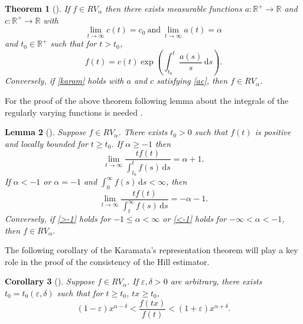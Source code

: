 \documentclass[english,12pt,a4paper,pdftex,sci,utf8]{aaltothesis} %
\newtheorem{theorem}{Theorem}[section]
\newtheorem{corollary}[theorem]{Corollary}
\newtheorem{lemma}[theorem]{Lemma}
\begin{document}
\begin{theorem}[{\cite[Theorem B.1.6]{deHaan}}]
If $f \in RV_{\alpha}$ then there exists measurable functions $a: \mathbb{R^+} \rightarrow \mathbb{R}$ and $c: \mathbb{R^+} \rightarrow \mathbb{R}$ with
\begin{equation}
\lim_{t \rightarrow \infty} c(t) = c_0 \  \text{and} \  \lim_{t \rightarrow \infty} a(t) = \alpha
\label{ac}
\end{equation}
and $t_0 \in \mathbb{R^+}$ such that for $t > t_0$,
\begin{equation}
f(t) = c(t) \exp \left(\int_{t_0}^{t}  \frac{a(s)}{s} \, \mathrm{d}s \right).
\label{karam}
\end{equation}
Conversely, if \eqref{karam} holds with $a$ and $c$ satisfying \eqref{ac}, then $f \in RV_{\alpha}$.
\label{karamata}
\end{theorem}

For the proof of the above theorem following lemma about the integrals of the regularly varying functions is needed \cite{deHaan}.

\begin{lemma}[{\cite[Theorem B.1.5]{deHaan}}]
Suppose $f \in RV_{\alpha}$. There exists $t_0 > 0$ such that $f(t)$ is positive and locally bounded for $t \geq t_0$. If $\alpha \geq -1$ then
\begin{equation}
\lim_{t \rightarrow \infty} \frac{tf(t)}{\int_{t_0}^{t}f(s) \, \mathrm{d}s} = \alpha + 1.
\label{>-1}
\end{equation}
If $\alpha<-1$ or $\alpha= -1$ and $\int_{0}^{\infty}f(s) \, \mathrm{d}s<\infty$, then
\begin{equation}
\lim_{t \rightarrow \infty} \frac{tf(t)}{\int_{t}^{\infty} f(s) \, \mathrm{d}s} = -\alpha - 1.
\label{<-1}
\end{equation}
Conversely, if \eqref{>-1} holds for $-1\leq \alpha < \infty$ or \eqref{<-1} holds for $-\infty<\alpha<-1$, then $f \in RV_{\alpha}$.
\label{karamlemma}
\end{lemma}



The following corollary \cite{potter} of the Karamata’s representation theorem will play a key role in the proof of the consistency of the Hill estimator. 

\begin{corollary}[{\cite[Proposition B.1.9]{deHaan}}]
Suppose $f \in RV_{\alpha}$. If $\varepsilon, \delta>0$ are arbitrary, there exists $t_0=t_0(\varepsilon, \delta)$ such that for $t\geq t_0$, $tx \geq t_0$,
\begin{equation*}
(1-\varepsilon)x^{\alpha-\delta}<\frac{f(tx)}{f(t)}<(1+\varepsilon)x^{\alpha+\delta}.
\end{equation*}
\label{inequality}
\end{corollary}
\end{document}
